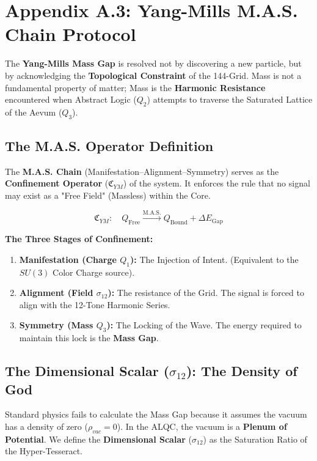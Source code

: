 \documentclass[12pt]{amsart}
\begin{document}
\section{Appendix A.3: Yang-Mills M.A.S. Chain Protocol}\label{appendixA.3}

The \textbf{Yang-Mills Mass Gap} is resolved not by discovering a new particle, but by acknowledging the \textbf{Topological Constraint} of the 144-Grid. Mass is not a fundamental property of matter; Mass is the \textbf{Harmonic Resistance} encountered when Abstract Logic ($Q_2$) attempts to traverse the Saturated Lattice of the Aevum ($Q_3$).

\subsection{The M.A.S. Operator Definition}\label{appendixA.3.1}
The \textbf{M.A.S. Chain} (Manifestation--Alignment--Symmetry) serves as the \textbf{Confinement Operator} ($\mathfrak{C}_{YM}$) of the system. It enforces the rule that no signal may exist as a "Free Field" (Massless) within the Core.

\begin{equation}
    \mathfrak{C}_{YM}: \quad Q_{\text{Free}} \xrightarrow{\text{M.A.S.}} Q_{\text{Bound}} + \Delta E_{\text{Gap}}
\end{equation}

\noindent \textbf{The Three Stages of Confinement:}
\begin{enumerate}
    \item \textbf{Manifestation (Charge $Q_1$):} The Injection of Intent. (Equivalent to the $SU(3)$ Color Charge source).
    \item \textbf{Alignment (Field $\sigma_{12}$):} The resistance of the Grid. The signal is forced to align with the 12-Tone Harmonic Series.
    \item \textbf{Symmetry (Mass $Q_3$):} The Locking of the Wave. The energy required to maintain this lock is the \textbf{Mass Gap}.
\end{enumerate}

\subsection{The Dimensional Scalar (\texorpdfstring{$\sigma_{12}$}{sigma-12}): The Density of God}
\label{appendixA.3.2}
Standard physics fails to calculate the Mass Gap because it assumes the vacuum has a density of zero ($\rho_{vac} = 0$). In the ALQC, the vacuum is a \textbf{Plenum of Potential}. We define the \textbf{Dimensional Scalar} ($\sigma_{12}$) as the Saturation Ratio of the Hyper-Tesseract.
\end{document}
